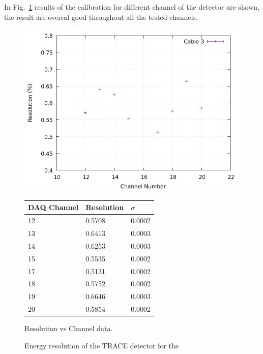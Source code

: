 In Fig.~\ref{res} results of the calibration for different channel of the detector are shown, the result are overral good throughout all the tested channels.

\begin{figure}[h]
  \centering
  \begin{minipage}[b]{0.45\textwidth}
  \vspace{5mm}
    \includegraphics[width=\textwidth]{img/plot/am/3_res_am.png}
    \label{res:am3}
  \end{minipage}
  \hfill
  \begin{minipage}[b]{0.45\textwidth}
  \begin{tabular}{lll}
    DAQ Channel & Resolution & $\sigma$ \\
    \midrule
    12 & \num{0.5708} & 0.0002 \\
    13 & \num{0.6413} & 0.0003 \\
    14 & \num{0.6253} & 0.0003 \\
    15 & \num{0.5535} & 0.0002 \\
    17 & \num{0.5131} & 0.0002 \\
    18 & \num{0.5752} & 0.0002 \\
    19 & \num{0.6646} & 0.0003 \\
    20 & \num{0.5854} & 0.0002 \\
    \bottomrule
  \end{tabular}
  \caption{Resolution vs Channel data.}
  \label{res:plot:am3}
  \end{minipage}
  \caption{Energy resolution of the TRACE detector for the}
  \label{res}
\end{figure}


